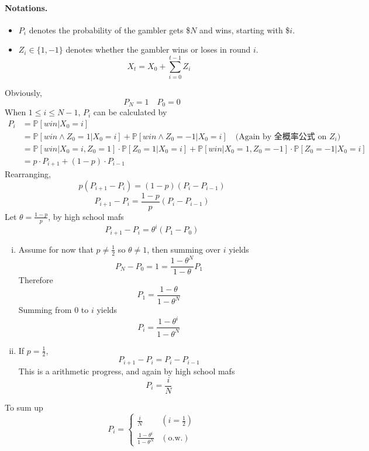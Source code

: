     \paragraph*{Notations.}
    \begin{itemize}
        \item $P_i$ denotes the probability of the gambler gets \$$N$ and wins, starting with \$$i$.
        \item $Z_i \in \{1, -1\}$ denotes whether the gambler wins or loses in round $i$.
        \[ X_t = X_0 + \sum_{i=0}^{t-1}Z_i \]
    \end{itemize}
    Obviously,
    \[ P_N = 1 \quad P_0 = 0 \]
    When $1 \le i \le N-1$, $P_i$ can be calculated by
    \begin{align*}
        P_i &= \mathbb{P}[win | X_0 = i] \\
        &= \mathbb{P}[win \wedge Z_0 = 1 | X_0 = i] + \mathbb{P}[win \wedge Z_0 = -1 | X_0 = i] \quad \text{(Again by 全概率公式 on $Z_i$)} \\
        &= \mathbb{P}[win | X_0=i, Z_0 = 1]\cdot\mathbb{P}[Z_0=1|X_0=i] + \mathbb{P}[win|X_0=1, Z_0=-1]\cdot\mathbb{P}[Z_0=-1|X_0=i] \\
        &= p\cdot P_{i+1} + (1-p)\cdot P_{i-1}
    \end{align*}
    Rearranging,
    \[ p(P_{i+1} - P_i) = (1-p)(P_i - P_{i-1}) \]
    \[ P_{i+1} -P_i = \frac{1-p}{p}(P_i - P_{i-1}) \]
    Let $\theta = \frac{1-p}{p}$, by high school mafs
    \[ P_{i+1} - P_i = \theta^i(P_1 - P_{0}) \]
    \begin{enumerate}[(i)]
        \item Assume for now that $p \neq \frac{1}{2}$ so $\theta \neq 1$, then summing over $i$ yields
        \[ P_N - P_0 = 1 = \frac{1-\theta^N}{1-\theta} P_1 \]
        Therefore
        \[ P_1 = \frac{1-\theta}{1-\theta^N} \]
        Summing from $0$ to $i$ yields
        \[ P_i = \frac{1-\theta^i}{1-\theta^N} \]
        \item If $p=\frac{1}{2}$,
        \[ P_{i+1} - P_i = P_i - P_{i-1} \]
        This is a arithmetic progress, and again by high school mafs
        \[ P_i = \frac{i}{N} \]
    \end{enumerate}
    To sum up
    \[ 
        P_i = 
        \begin{cases}
            \frac{i}{N} &(i = \frac{1}{2})\\
            \frac{1-\theta^i}{1-\theta^N} &(\text{o.w.})
        \end{cases}    
    \]

